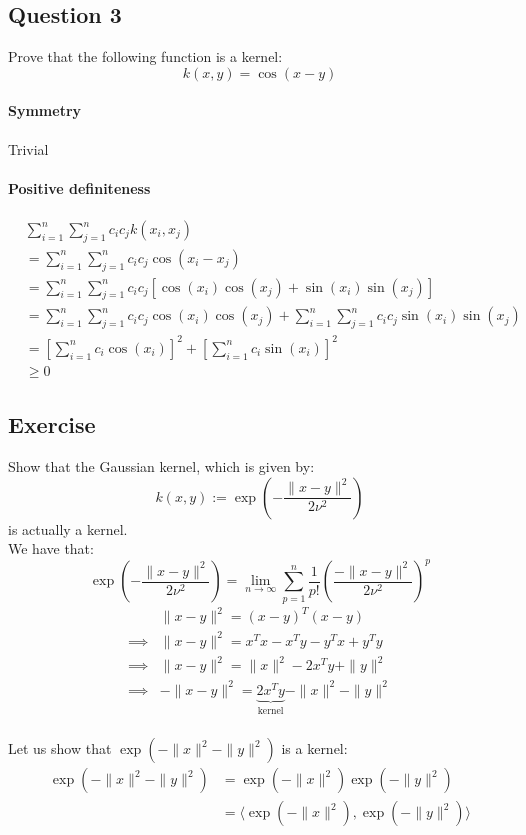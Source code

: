 \documentclass{article}
\newcommand{\1}{\mathbf{1}}
\begin{document}
\subsection{Question 3}
Prove that the following function is a kernel:
\begin{equation*}
  k(x,y) = \cos(x-y)
\end{equation*}
\paragraph{Symmetry} Trivial

\paragraph{Positive definiteness}

\begin{align*}
   & \sum_{i=1}^n \sum_{j=1}^n c_i c_j k(x_i, x_j)                                                                   \\
   & = \sum_{i=1}^n \sum_{j=1}^n c_i c_j \cos(x_i - x_j)                                                             \\
   & = \sum_{i=1}^n \sum_{j=1}^n c_i c_j \left[\cos(x_i) \cos(x_j) + \sin(x_i) \sin(x_j)\right]                      \\
   & = \sum_{i=1}^n \sum_{j=1}^n c_i c_j \cos(x_i) \cos(x_j) + \sum_{i=1}^n \sum_{j=1}^n c_i c_j \sin(x_i) \sin(x_j) \\
   & = \left[\sum_{i=1}^n c_i \cos(x_i)\right]^2 + \left[\sum_{i=1}^n c_i \sin(x_i)\right]^2                         \\
   & \geq 0
\end{align*}

\subsection{Exercise}
Show that the Gaussian kernel, which is given by:
\begin{equation*}
  k(x,y) := \exp \left(- \frac{\|x-y\|^2}{2\nu^2}\right)
\end{equation*}
is actually a kernel. \\
We have that:
\begin{equation*}
  \exp \left(- \frac{\|x-y\|^2}{2\nu^2}\right) = \lim_{n \to \infty} \sum_{p=1}^n \frac{1}{p!} \left(\frac{-\|x-y\|^2}{2\nu^2}\right)^p
\end{equation*}
\begin{align*}
           & \|x-y\|^2 = (x-y)^T (x-y)      \\
  \implies &
  \|x-y\|^2 = x^T x - x^T y - y^T x + y^T y \\
  \implies &
  \|x-y\|^2 = \|x\|^2 - 2x^T y + \|y\|^2    \\
  \implies &
  - \|x-y\|^2 = \underbrace{2x^T y}_{\text{kernel}} - \|x\|^2 - \|y\|^2    \\
\end{align*}

Let us show that \(\exp\left(- \|x\|^2 - \|y\|^2\right)\) is a kernel:
\begin{align*}
  \exp\left(- \|x\|^2 - \|y\|^2\right)
  &= \exp\left(- \|x\|^2 \right) \exp \left(- \|y\|^2\right) \\
  &= \langle \exp\left(- \|x\|^2 \right), \exp \left(- \|y\|^2\right) \rangle \\
\end{align*}
\end{document}
